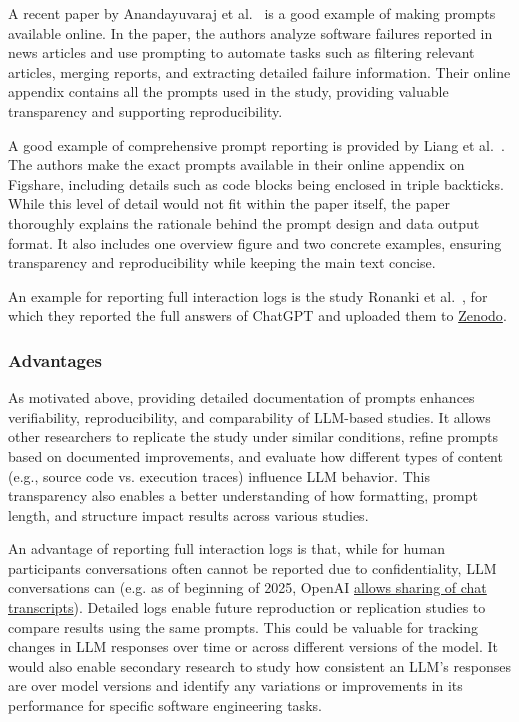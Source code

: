 A recent paper by Anandayuvaraj et al.~\cite{anandayuvaraj2024fail} is a good example of making prompts available online. In the paper, the authors analyze software failures reported in news articles and use prompting to automate tasks such as filtering relevant articles, merging reports, and extracting detailed failure information. Their online appendix contains all the prompts used in the study, providing valuable transparency and supporting reproducibility.

A good example of comprehensive prompt reporting is provided by Liang et al.~\cite{Liang2024}. The authors make the exact prompts available in their online appendix on Figshare, including details such as code blocks being enclosed in triple backticks. While this level of detail would not fit within the paper itself, the paper thoroughly explains the rationale behind the prompt design and data output format. It also includes one overview figure and two concrete examples, ensuring transparency and reproducibility while keeping the main text concise.

An example for reporting full interaction logs is the study Ronanki et al.~\cite{ronanki2023investigating}, for which they reported the full answers of ChatGPT and uploaded them to \href{https://zenodo.org/records/8124936}{Zenodo}. 


\subsubsection{Advantages}

As motivated above, providing detailed documentation of prompts enhances verifiability, reproducibility, and comparability of LLM-based studies.
It allows other researchers to replicate the study under similar conditions, refine prompts based on documented improvements, and evaluate how different types of content (e.g., source code vs. execution traces) influence LLM behavior.
This transparency also enables a better understanding of how formatting, prompt length, and structure impact results across various studies.

An advantage of reporting full interaction logs is that, while for human participants conversations often cannot be reported due to confidentiality, LLM conversations can (e.g. as of beginning of 2025, OpenAI \href{https://openai.com/policies/sharing-publication-policy/}{allows sharing of chat transcripts}).
Detailed logs enable future reproduction or replication studies to compare results using the same prompts.
This could be valuable for tracking changes in LLM responses over time or across different versions of the model.
It would also enable secondary research to study how consistent an LLM's responses are over model versions and identify any variations or improvements in its performance for specific software engineering tasks.


